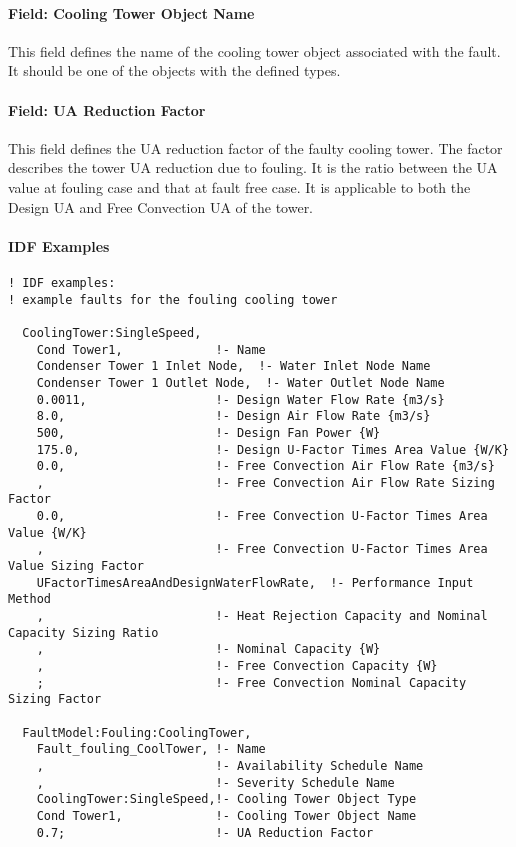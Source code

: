 \paragraph{Field: Cooling Tower Object Name}\label{field-tower-object-name}

This field defines the name of the cooling tower object associated with the fault. It should be one of the objects with the defined types.

\paragraph{Field: UA Reduction Factor}\label{field-ua-reduction-factor}

This field defines the UA reduction factor of the faulty cooling tower. The factor describes the tower UA reduction due to fouling. It is the ratio between the UA value at fouling case and that at fault free case. It is applicable to both the Design UA and Free Convection UA of the tower.

\paragraph{IDF Examples}

\begin{lstlisting}
! IDF examples:
! example faults for the fouling cooling tower

  CoolingTower:SingleSpeed,
    Cond Tower1,             !- Name
    Condenser Tower 1 Inlet Node,  !- Water Inlet Node Name
    Condenser Tower 1 Outlet Node,  !- Water Outlet Node Name
    0.0011,                  !- Design Water Flow Rate {m3/s}
    8.0,                     !- Design Air Flow Rate {m3/s}
    500,                     !- Design Fan Power {W}
    175.0,                   !- Design U-Factor Times Area Value {W/K}
    0.0,                     !- Free Convection Air Flow Rate {m3/s}
    ,                        !- Free Convection Air Flow Rate Sizing Factor
    0.0,                     !- Free Convection U-Factor Times Area Value {W/K}
    ,                        !- Free Convection U-Factor Times Area Value Sizing Factor
    UFactorTimesAreaAndDesignWaterFlowRate,  !- Performance Input Method
    ,                        !- Heat Rejection Capacity and Nominal Capacity Sizing Ratio
    ,                        !- Nominal Capacity {W}
    ,                        !- Free Convection Capacity {W}
    ;                        !- Free Convection Nominal Capacity Sizing Factor

  FaultModel:Fouling:CoolingTower,
    Fault_fouling_CoolTower, !- Name
    ,                        !- Availability Schedule Name
    ,                        !- Severity Schedule Name
    CoolingTower:SingleSpeed,!- Cooling Tower Object Type
    Cond Tower1,             !- Cooling Tower Object Name
    0.7;                     !- UA Reduction Factor

\end{lstlisting}



